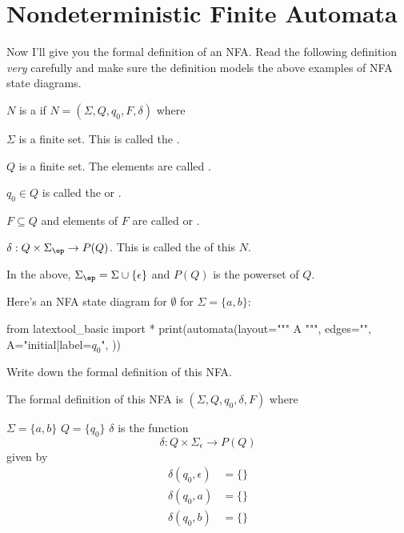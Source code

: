 \section{Nondeterministic Finite Automata}

Now I'll give you the formal definition of an NFA.
Read the following
definition \textit{very} carefully and make sure the definition models
the above examples of NFA state diagrams.

\begin{defn}
  $N$ is a
  if $N =
  (\Sigma,Q,q_0,F,\delta)$ where
  \begin{tightlist}
  \item $\Sigma$ is a finite set. This is called the
    .
  \item $Q$ is a finite set. The elements are called
    .
  \item $q_0 \in Q$ is called the
    or
    \tinysidebarskip{}\sidebarskip{0pt}.
  \item $F \subseteq Q$ and elements of $F$ are called
    or
    \tinysidebarskip{}\sidebarskip{0pt}.
  \item $\delta : Q \times \Sigma_\ep \rightarrow P(Q)$.
    This is called the 
    of this $N$.
  \end{tightlist}
  In the above, $\Sigma_\ep = \Sigma \cup \{\epsilon\}$
  and $P(Q)$ is the powerset of $Q$.
\end{defn}

\newpage
\begin{ex}
  Here's an NFA state diagram
  for $\emptyset$ for $\Sigma = \{a,b\}$:

\begin{python}
from latextool_basic import *
print(automata(layout="""
A
""",
edges="",
A="initial|label=$q_0$",
))
\end{python}

Write down the formal definition of this NFA.
\end{ex}

\SOLUTION

The formal definition of this NFA is $(\Sigma, Q, q_0, \delta, F)$ where
\begin{tightlist}
\li $\Sigma = \{a,b\}$
\li $Q = \{q_0\}$
\li $\delta$ is the function
\[
\delta : Q \times \Sigma_\epsilon \rightarrow P(Q)
\]
given by
\begin{align*}
  \delta(q_0, \epsilon) &= \{\} \\
  \delta(q_0, a) &= \{\} \\
  \delta(q_0, b) &= \{\} 
\end{align*}
\end{tightlist}


